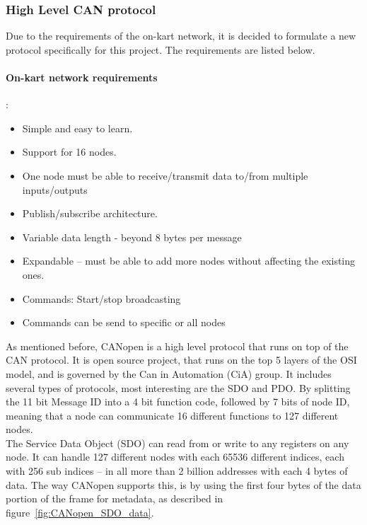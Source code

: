 
\subsubsection{High Level CAN protocol}\label{sub:CAN_protocol}
Due to the requirements of the on-kart network, it is decided to formulate a new protocol specifically for this project. The requirements are listed below.\\
\paragraph{On-kart network requirements}:
\begin{itemize}
	\item Simple and easy to learn.
	\item Support for 16 nodes.
	\item One node must be able to receive/transmit data to/from multiple inputs/outputs
	\item Publish/subscribe architecture.
	\item Variable data length - beyond 8 bytes per message
	\item Expandable -- must be able to add more nodes without affecting the existing ones.
	\item Commands: Start/stop broadcasting 
	\item Commands can be send to specific or all nodes
\end{itemize}

\label{sub:CANopen}
As mentioned before, CANopen is a high level protocol that runs on top of the CAN protocol.
It is open source project, that runs on the top 5 layers of the OSI model\cite{CANopen_introduction}, and is governed by the Can in Automation (CiA) group.
It includes several types of protocols, most interesting are the SDO and PDO. 
By splitting the 11 bit Message ID into a 4 bit function code, followed by 7 bits of node ID, meaning that a node can communicate 16 different functions to 127 different nodes.\\
The Service Data Object (SDO) can read from or write to any registers on any node. 
It can handle 127 different nodes with each 65536 different indices, each with 256 sub indices -- in all more than 2 billion addresses with each 4 bytes of data.
The way CANopen supports this, is by using the first four bytes of the data portion of the frame for metadata, as described in figure~\ref{fig:CANopen_SDO_data}.


